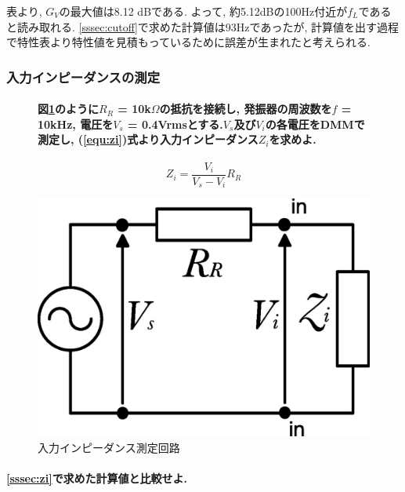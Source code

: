 \documentclass[titlepage]{jsarticle}
\begin{document}
                表より, $G_V$の最大値は8.12 dBである. よって, 約5.12dBの100Hz付近が$f_L$であると読み取れる.
                \ref{sssec:cutoff}で求めた計算値は93Hzであったが,
                計算値を出す過程で特性表より特性値を見積もっているために誤差が生まれたと考えられる.

        \subsubsection{入力インピーダンスの測定}
            \begin{figure}[H]
                \begin{minipage}{0.6\hsize}
                    \paragraph{図\ref{fig:tr_zi}のように$R_R$ = 10k$\Omega$の抵抗を接続し, 発振器の周波数を$f$ = 10kHz, 電圧を$V_s$ = 0.4Vrmsとする.$V_s$及び$V_i$の各電圧をDMMで測定し, (\ref{equ:zi})式より入力インピーダンス$Z_i$を求めよ.}
                    
                    \begin{equation}
                        Z_i = \frac{V_i}{V_s - V_i} R_R \label{equ:zi}
                    \end{equation}
                \end{minipage}
                \begin{minipage}{0.4\hsize}
                    \centering
                    \includegraphics[width=0.72\hsize]{images/tr_zi.eps}
                    \caption{入力インピーダンス測定回路}
                    \label{fig:tr_zi}
                \end{minipage}
            \end{figure}

            \paragraph{\ref{sssec:zi}で求めた計算値と比較せよ.}
            \mbox{} \\
\end{document}
